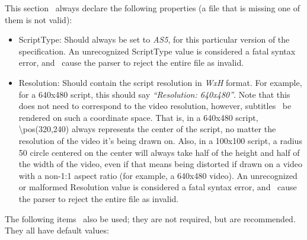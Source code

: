 \documentclass{spec}
\begin{document}
This section \must\ always declare the following properties (a file that is missing one of them is not valid):

\begin{itemize}
\item ScriptType: Should always be set to \textit{AS5}, for this particular version of the specification.
An unrecognized ScriptType value is considered a fatal syntax error, and \must\ cause the parser to
reject the entire file as invalid.
\item Resolution: Should contain the script resolution in \textit{WxH} format. For example, for a 640x480
script, this should say \textit{``Resolution: 640x480''}. Note that this does not need to correspond to the
video resolution, however, subtitles \must\ be rendered on such a coordinate space. That is, in a
640x480 script, \textbackslash{pos(320,240)} always represents the center of the script, no matter the
resolution of the video it's being drawn on. Also, in a 100x100 script, a radius 50 circle centered on
the center will always take half of the height and half of the width of the video, even if that means
being distorted if drawn on a video with a non-1:1 aspect ratio (for example, a 640x480 video).
An unrecognized or malformed Resolution value is considered a fatal syntax error, and \must\ cause the parser
to reject the entire file as invalid.
\end{itemize}

The following items \may\ also be used; they are not required, but are recommended. They all have default values:
\end{document}
